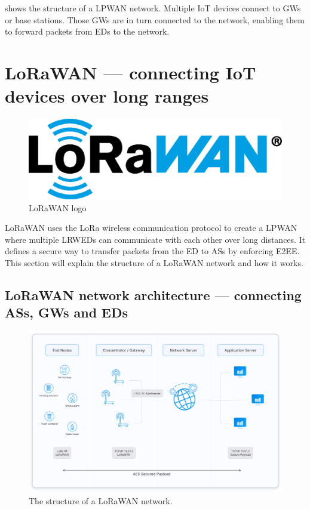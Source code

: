  shows the structure of a \ac{LPWAN} network.
Multiple \ac{IoT} devices connect to \aclp{GW} or base stations.
Those \aclp{GW} are in turn connected to the network, enabling them to forward packets from \aclp{ED} to the network.

\section{\acl{LoRaWAN} — connecting \acl{IoT} devices over long ranges}\label{sec:lorawan}

\begin{figure}[htbp]
    \centering
    \includegraphics[width=.3\textwidth]{pictures/logos/LoRaWAN_Logo.eps}
    \caption[\ac{LoRaWAN} logo]{
        \ac{LoRaWAN} logo~\protect\cite{lora_alliance_francais_2022}
    }
\end{figure}

\ac{LoRaWAN} uses the \ac{LoRa} wireless communication protocol to create a \ac{LPWAN} where multiple \aclp{LRWED} can communicate with each other over long distances.
It defines a secure way to transfer packets from the \acl{ED} to \acp{AS} by enforcing \ac{E2EE}.
This section will explain the structure of a \ac{LoRaWAN} network and how it works.

\subsection{\acs{LoRaWAN} network architecture — connecting \aclp{AS}, \aclp{GW} and \aclp{ED}}

\begin{figure}[htbp]
    \centering
    \includegraphics[width=1\textwidth]{pictures/lorawan-structure/lorawan-architecture.png}
    \caption[Structure of a \ac{LoRaWAN} network]{
        The structure of a \ac{LoRaWAN} network.~\protect\cite{the_things_industries_bv_lorawan_nodate}
    }\label{pic:lorawan-network-structure}
\end{figure}

